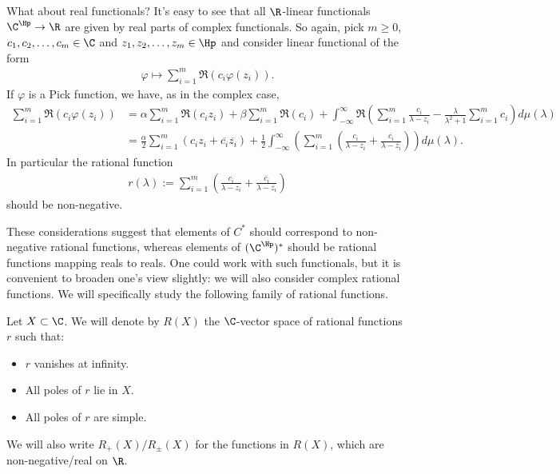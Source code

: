 What about real functionals? It's easy to see that all $\R$-linear functionals $\C^{\Hp} \to \R$ are given by real parts of complex functionals. So again, pick $m \geq 0$, $c_{1}, c_{2}, \ldots, c_{m} \in \C$ and $z_{1}, z_{2}, \ldots, z_{m} \in \Hp$ and consider linear functional of the form
\begin{align*}
	\varphi \mapsto \sum_{i = 1}^{m} \Re\left(c_{i} \varphi(z_{i})\right).
\end{align*}
If $\varphi$ is a Pick function, we have, as in the complex case,
\begin{align*}
	\sum_{i = 1}^{m} \Re(c_{i} \varphi(z_{i})) &= \alpha \sum_{i = 1}^{m} \Re(c_{i} z_{i}) + \beta \sum_{i = 1}^{m} \Re(c_{i}) + \int_{-\infty}^{\infty} \Re\left( \sum_{i = 1}^{m}\frac{c_{i}}{\lambda - z_{i}} - \frac{\lambda}{\lambda^2 + 1} \sum_{i = 1}^{m} c_{i} \right) d \mu(\lambda) \\
	&= \frac{\alpha}{2} \sum_{i = 1}^{m} \left(c_{i} z_{i} + \overline{c_{i}} \overline{z_{i}}\right) + \frac{1}{2}\int_{-\infty}^{\infty} \left( \sum_{i = 1}^{m} \left(\frac{c_{i}}{\lambda - z_{i}} + \frac{\overline{c_{i}}}{\lambda - \overline{z_{i}}}\right)\right) d \mu(\lambda).
\end{align*}
In particular the rational function
\begin{align*}
	r(\lambda) := \sum_{i = 1}^{m} \left(\frac{c_{i}}{\lambda - z_{i}} + \frac{\overline{c_{i}}}{\lambda - \overline{z_{i}}}\right)
\end{align*}
should be non-negative.

These considerations suggest that elements of $C^{*}$ should correspond to non-negative rational functions, whereas elements of $(\C^{\Hp})^{*}$ should be rational functions mapping reals to reals. One could work with such functionals, but it is convenient to broaden one's view slightly: we will also consider complex rational functions. We will specifically study the following family of rational functions.

\begin{maar}
	Let $X \subset \C$. We will denote by $R(X)$ the $\C$-vector space of rational functions $r$ such that:
	\begin{itemize}
		\item $r$ vanishes at infinity.
		\item All poles of $r$ lie in $X$.
		\item All poles of $r$ are simple.
	\end{itemize}
	We will also write $R_{+}(X)/R_{\pm}(X)$ for the functions in $R(X)$, which are non-negative/real on $\R$.
\end{maar}

